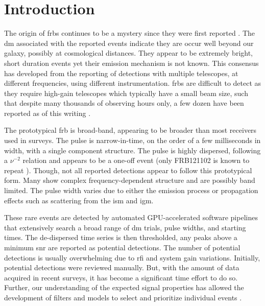 \documentclass[a4paper,fleqn,usenatbib]{mnras}
\begin{document}

\section{Introduction}
\label{sec:intro}

The origin of \glspl{frb} continues to be a mystery since they were first
reported \citep{2007Sci...318..777L}. The \gls{dm} associated with the reported
events indicate they are occur well beyond our galaxy, possibly at cosmological
distances. They appear to be extremely bright, short duration events yet their
emission mechanism is not known.  This consensus has developed from the
reporting of detections with multiple telescopes, at different frequencies,
using different instrumentation. \glspl{frb} are difficult to detect as they
require high-gain telescopes which typically have a small beam size, such that
despite many thousands of observing hours only, a few dozen have been reported
as of this writing \citep{2016PASA...33...45P}.

The prototypical \gls{frb} is broad-band, appearing to be broader than most
receivers used in surveys. The pulse is narrow-in-time, on the order of a few
milliseconds in width, with a single component structure. The pulse is highly
dispersed, following a $\nu^{-2}$ relation and appears to be a one-off event
(only FRB121102 is known to repeat \citep{2016Natur.531..202S}).  Though, not
all reported detections appear to follow this prototypical form. Many show
complex frequency-dependent structure and are possibly band limited. The pulse
width varies due to either the emission process or propagation effects such as
scattering from the \gls{ism} and \gls{igm}.

These rare events are detected by automated GPU-accelerated software pipelines
that extensively search a broad range of \gls{dm} trials, pulse widths, and
starting times.  The de-dispersed time series is then thresholded, any
peaks above a minimum \gls{snr} are reported as potential detections. The number
of potential detections is usually overwhelming due to \gls{rfi} and system gain
variations. Initially, potential detections were reviewed manually. But, with
the amount of data acquired in recent surveys, it has become a significant time
effort to do so. Further, our understanding of the expected signal properties
has allowed the development of filters and models to select and prioritize
individual events \citep{2018MNRAS.474.3847F}.
\end{document}
